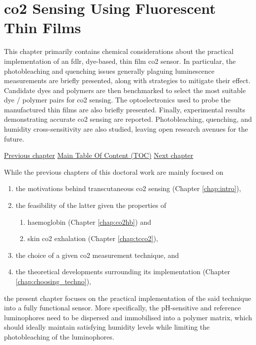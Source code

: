\chapter{\texorpdfstring{\gls{co2}}{CO2} Sensing Using Fluorescent Thin Films}\label{chap:thin_film}

\begin{tldrbox}
	
	This chapter primarily contains chemical considerations about the practical implementation of an \gls{fdlr}, dye-based, thin film \gls{co2} sensor. In particular, the photobleaching and quenching issues generally plaguing luminescence measurements are briefly presented, along with strategies to mitigate their effect. Candidate dyes and polymers are then benchmarked to select the most suitable dye / polymer pairs for \gls{co2} sensing. The optoelectronics used to probe the manufactured thin films are also briefly presented. Finally, experimental results demonstrating accurate \invitro{} \gls{co2} sensing are reported. Photobleaching, quenching, and humidity cross-sensitivity are also studied, leaving open research avenues for the future.
	
	\tcblower
	
	\hyperref[chap:choosing_techno]{Previous chapter} \hfill \hyperref[chapter:toc]{Main Table Of Content (TOC)} \hfill \hyperref[chap:conclusion]{Next chapter}
	
\end{tldrbox}

While the previous chapters of this doctoral work are mainly focused on
\begin{enumerate}
	\item the motivations behind transcutaneous \gls{co2} sensing (Chapter \ref{chap:intro}),
	\item the feasibility of the latter given the properties of
	\begin{enumerate}[label=(\alph*)]
		\item haemoglobin (Chapter \ref{chap:co2hb}) and
		\item skin \gls{co2} exhalation (Chapter \ref{chap:tcco2}),
	\end{enumerate}
	\item the choice of a given \gls{co2} measurement technique, and
	\item the theoretical developments surrounding its implementation (Chapter \ref{chap:choosing_techno}),
\end{enumerate}
the present chapter focuses on the practical implementation of the said technique into a fully functional sensor. More specifically, the pH-sensitive and reference luminophores need to be dispersed and immobilised into a polymer matrix, which should ideally maintain satisfying humidity levels while limiting the photobleaching of the luminophores.

